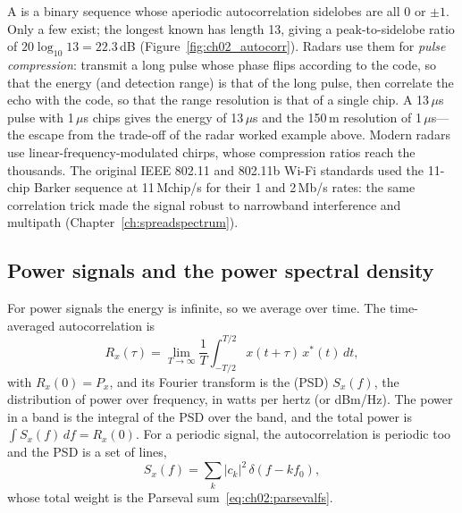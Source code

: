 \begin{inpractice}
A  is a binary sequence whose aperiodic autocorrelation sidelobes are all 0 or
$\pm1$. Only a few exist; the longest known has length 13, giving a peak-to-sidelobe ratio of
$20\log_{10}13=22.3$\,dB (Figure~\ref{fig:ch02_autocorr}). Radars use them for \emph{pulse
compression}: transmit a long pulse whose phase flips according to the code, so that the energy
(and detection range) is that of the long pulse, then correlate the echo with the code, so that the
range resolution is that of a single chip. A 13\,$\mu$s pulse with 1\,$\mu$s chips gives the energy
of 13\,$\mu$s and the 150\,m resolution of 1\,$\mu$s---the escape from the trade-off of the radar
worked example above. Modern radars use linear-frequency-modulated chirps, whose compression ratios
reach the thousands. The original IEEE 802.11 and 802.11b Wi-Fi standards used the 11-chip Barker
sequence at 11\,Mchip/s for their 1 and 2\,Mb/s rates: the same correlation trick made the
signal robust to narrowband interference and multipath (Chapter~\ref{ch:spreadspectrum}).
\end{inpractice}


\subsection{Power signals and the power spectral density}

For power signals the energy is infinite, so we average over time. The time-averaged
autocorrelation is
\begin{equation}
R_x(\tau)=\lim_{T\to\infty}\frac{1}{T}\int_{-T/2}^{T/2}x(t+\tau)\,x^*(t)\,dt ,
\end{equation}
with $R_x(0)=P_x$, and its Fourier transform is the  (PSD) $S_x(f)$,
the distribution of power over frequency, in watts per hertz (or dBm/Hz). The power in a band is the
integral of the PSD over the band, and the total power is $\int S_x(f)\,df=R_x(0)$. For a periodic
signal, the autocorrelation is periodic too and the PSD is a set of lines,
\begin{equation}
S_x(f)=\sum_k|c_k|^2\,\delta(f-kf_0),
\end{equation}
whose total weight is the Parseval sum~\eqref{eq:ch02:parsevalfs}.

